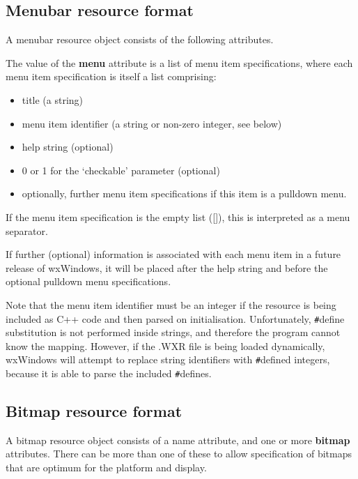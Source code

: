 \subsection{Menubar resource format}

A menubar resource object consists of the following attributes.

\begin{twocollist}\itemsep=0pt
\end{twocollist}

The value of the {\bf menu} attribute is a list of menu item specifications, where each menu
item specification is itself a list comprising:

\begin{itemize}\itemsep=0pt
\item title (a string)
\item menu item identifier (a string or non-zero integer, see below)
\item help string (optional)
\item 0 or 1 for the `checkable' parameter (optional)
\item optionally, further menu item specifications if this item is a pulldown menu.
\end{itemize}

If the menu item specification is the empty list ([]), this is interpreted as a menu separator.

If further (optional) information is associated with each menu item in a future release of wxWindows,
it will be placed after the help string and before the optional pulldown menu specifications.

Note that the menu item identifier must be an integer if the resource is being
included as C++ code and then parsed on initialisation. Unfortunately,\rtfsp
\verb$#$define substitution is not performed inside strings, and
therefore the program cannot know the mapping. However, if the .WXR file
is being loaded dynamically, wxWindows will attempt to replace string
identifiers with \verb$#$defined integers, because it is able to parse
the included \verb$#$defines.

\subsection{Bitmap resource format}

A bitmap resource object consists of a name attribute, and one or more {\bf bitmap} attributes.
There can be more than one of these to allow specification of bitmaps that are optimum for the
platform and display.

